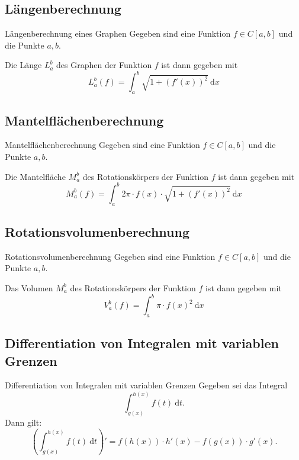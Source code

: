 \documentclass[german]{spicker}
\newcommand{\dx}{~\mathrm{d}x}
\newcommand{\dt}{~\mathrm{d}t}
\begin{document}
\newpage
\subsection{Längenberechnung}

\begin{algo}{Längenberechnung eines Graphen}
    Gegeben sind eine Funktion $f\in C[a, b]$ und die Punkte $a, b$.

    Die Länge $L_a^b$ des Graphen der Funktion $f$ ist dann gegeben mit
    $$
        L^b_a(f) = \int_a^b \sqrt{1+(f'(x))^2} \dx
    $$
\end{algo}

\subsection{Mantelflächenberechnung}

\begin{algo}{Mantelflächenberechnung}
    Gegeben sind eine Funktion $f\in C[a, b]$ und die Punkte $a, b$.

    Die Mantelfläche $M_a^b$ des Rotationskörpers der Funktion $f$ ist dann gegeben mit
    $$
        M^b_a(f) = \int_a^b 2\pi \cdot f(x) \cdot \sqrt{1+(f'(x))^2} \dx
    $$
\end{algo}

\subsection{Rotationsvolumenberechnung}

\begin{algo}{Rotationsvolumenberechnung}
    Gegeben sind eine Funktion $f\in C[a, b]$ und die Punkte $a, b$.

    Das Volumen $M_a^b$ des Rotationskörpers der Funktion $f$ ist dann gegeben mit
    $$
        V^b_a(f) = \int_a^b \pi \cdot f(x)^2 \dx
    $$
\end{algo}

\subsection{Differentiation von Integralen mit variablen Grenzen}

\begin{algo}{Differentiation von Integralen mit variablen Grenzen}
    Gegeben sei das Integral
    $$
        \int^{h(x)}_{g(x)} f(t)\dt.
    $$
    Dann gilt:
    $$
        \left(\int^{h(x)}_{g(x)} f(t)\dt\right)' = f(h(x)) \cdot h'(x) - f(g(x))\cdot g'(x).
    $$
\end{algo}
\end{document}
